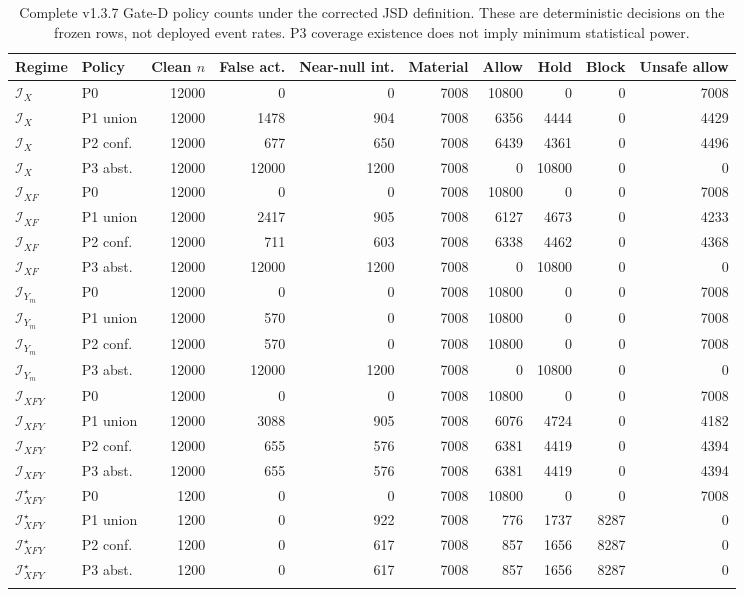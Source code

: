 \begin{table}[!tbp]
\caption{Complete v1.3.7 Gate-D policy counts under the corrected JSD definition. These are deterministic decisions on the frozen rows, not deployed event rates. P3 coverage existence does not imply minimum statistical power.}
\label{tab:v137-policy-full}
\centering\scriptsize\setlength{\tabcolsep}{2.4pt}
\begin{tabular}{@{}llrrrrrrrr@{}}
\toprule
Regime & Policy & Clean $n$ & False act. & Near-null int. & Material & Allow & Hold & Block & Unsafe allow \\
\midrule
$\mathcal I_X$ & P0 & 12000 & 0 & 0 & 7008 & 10800 & 0 & 0 & 7008 \\
$\mathcal I_X$ & P1 union & 12000 & 1478 & 904 & 7008 & 6356 & 4444 & 0 & 4429 \\
$\mathcal I_X$ & P2 conf. & 12000 & 677 & 650 & 7008 & 6439 & 4361 & 0 & 4496 \\
$\mathcal I_X$ & P3 abst. & 12000 & 12000 & 1200 & 7008 & 0 & 10800 & 0 & 0 \\
\addlinespace[1pt]
$\mathcal I_{XF}$ & P0 & 12000 & 0 & 0 & 7008 & 10800 & 0 & 0 & 7008 \\
$\mathcal I_{XF}$ & P1 union & 12000 & 2417 & 905 & 7008 & 6127 & 4673 & 0 & 4233 \\
$\mathcal I_{XF}$ & P2 conf. & 12000 & 711 & 603 & 7008 & 6338 & 4462 & 0 & 4368 \\
$\mathcal I_{XF}$ & P3 abst. & 12000 & 12000 & 1200 & 7008 & 0 & 10800 & 0 & 0 \\
\addlinespace[1pt]
$\mathcal I_{Y_m}$ & P0 & 12000 & 0 & 0 & 7008 & 10800 & 0 & 0 & 7008 \\
$\mathcal I_{Y_m}$ & P1 union & 12000 & 570 & 0 & 7008 & 10800 & 0 & 0 & 7008 \\
$\mathcal I_{Y_m}$ & P2 conf. & 12000 & 570 & 0 & 7008 & 10800 & 0 & 0 & 7008 \\
$\mathcal I_{Y_m}$ & P3 abst. & 12000 & 12000 & 1200 & 7008 & 0 & 10800 & 0 & 0 \\
\addlinespace[1pt]
$\mathcal I_{XFY}$ & P0 & 12000 & 0 & 0 & 7008 & 10800 & 0 & 0 & 7008 \\
$\mathcal I_{XFY}$ & P1 union & 12000 & 3088 & 905 & 7008 & 6076 & 4724 & 0 & 4182 \\
$\mathcal I_{XFY}$ & P2 conf. & 12000 & 655 & 576 & 7008 & 6381 & 4419 & 0 & 4394 \\
$\mathcal I_{XFY}$ & P3 abst. & 12000 & 655 & 576 & 7008 & 6381 & 4419 & 0 & 4394 \\
\addlinespace[1pt]
$\mathcal I_{XFY}^{\star}$ & P0 & 1200 & 0 & 0 & 7008 & 10800 & 0 & 0 & 7008 \\
$\mathcal I_{XFY}^{\star}$ & P1 union & 1200 & 0 & 922 & 7008 & 776 & 1737 & 8287 & 0 \\
$\mathcal I_{XFY}^{\star}$ & P2 conf. & 1200 & 0 & 617 & 7008 & 857 & 1656 & 8287 & 0 \\
$\mathcal I_{XFY}^{\star}$ & P3 abst. & 1200 & 0 & 617 & 7008 & 857 & 1656 & 8287 & 0 \\
\addlinespace[1pt]
\bottomrule
\end{tabular}
\end{table}
